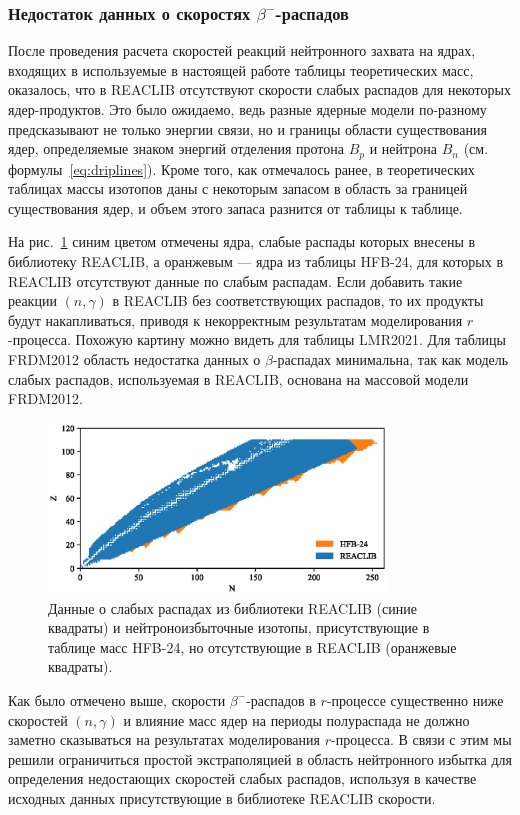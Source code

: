 \subsubsection{Недостаток данных о скоростях $\beta^-$-распадов}
  После проведения расчета скоростей реакций нейтронного захвата на ядрах, входящих в используемые в настоящей работе таблицы теоретических масс, оказалось, что в REACLIB отсутствуют скорости слабых распадов для некоторых ядер-продуктов.  Это было ожидаемо, ведь разные ядерные модели по-разному предсказывают не только энергии связи, но и границы области существования ядер, определяемые знаком энергий отделения протона $B_p$ и нейтрона $B_n$ (см. формулы~\ref{eq:driplines}). Кроме того, как отмечалось ранее, в теоретических таблицах массы изотопов даны с некоторым запасом в область за границей существования ядер, и объем этого запаса разнится от таблицы к таблице. 

  На рис.~\ref{img:weak_comparison} синим цветом отмечены ядра, слабые распады которых внесены в библиотеку REACLIB, а оранжевым --- ядра из таблицы HFB-24, для которых в REACLIB отсутствуют данные по слабым распадам. Если добавить такие реакции $(n,\gamma)$ в REACLIB без соответствующих распадов, то их продукты будут накапливаться, приводя к некорректным результатам моделирования $r$-процесса. Похожую картину можно видеть для таблицы LMR2021. Для таблицы FRDM2012 область недостатка данных о $\beta$-распадах минимальна, так как модель слабых распадов, используемая в REACLIB, основана на массовой модели FRDM2012.
  

\begin{figure}
  \centering
  \includegraphics[width=0.8\textwidth]{pics/chart_weak_comparison.eps}
  \caption{Данные о слабых распадах из библиотеки REACLIB (синие квадраты) и нейтроноизбыточные изотопы, присутствующие в таблице масс HFB-24, но отсутствующие в REACLIB (оранжевые квадраты).}
  \label{img:weak_comparison}
\end{figure}

  Как было отмечено выше, скорости $\beta^-$-распадов в $r$-процессе существенно ниже скоростей $(n,\gamma)$ и влияние масс ядер на периоды полураспада не должно заметно сказываться на результатах моделирования $r$-процесса. В связи с этим мы решили ограничиться простой экстраполяцией в область нейтронного избытка для определения недостающих скоростей слабых распадов, используя в качестве исходных данных присутствующие в библиотеке REACLIB скорости. 

